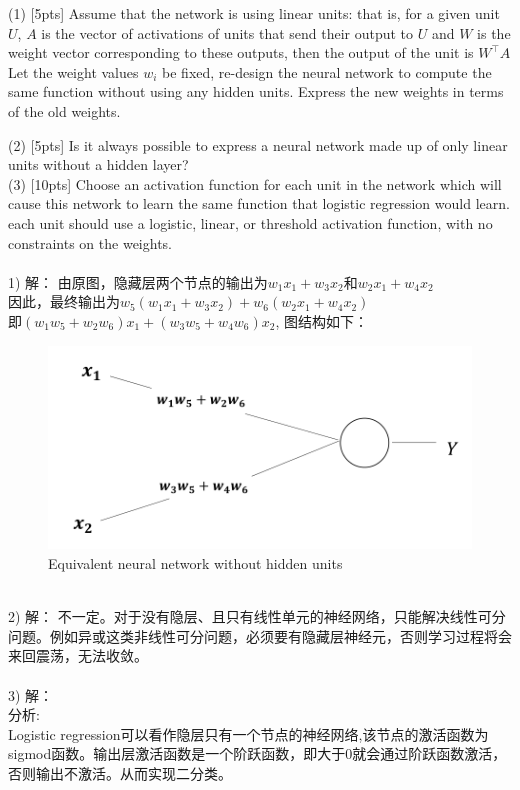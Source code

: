 \documentclass{article}
\begin{document}
	(1) [5pts] Assume that the network is using linear units: that is, for a given unit $U$, $A$ is the vector of activations of units that send their output to $U$ and $W$ is the weight vector corresponding to these outputs, then the output of the unit is $W^{\top}A$ Let the weight values $w_i$ be fixed, re-design the neural network to compute the same function without using any hidden units. Express the new weights in terms of the old weights.

	(2) [5pts] Is it always possible to express a neural network made up of only linear units without a hidden layer?\\
	
	(3) [10pts] Choose an activation function for each unit in the network which will cause this network to learn the same function that logistic regression would learn. each unit should use a logistic, linear, or threshold activation function, with no constraints on the weights.\\\\
	1) 解：
		由原图，隐藏层两个节点的输出为$w_1x_1+w_3x_2$和$w_2x_1+w_4x_2$\\
		因此，最终输出为$w_5(w_1x_1+w_3x_2)+w_6(w_2x_1+w_4x_2)$\\
		即$(w_1w_5+w_2w_6)x_1+(w_3w_5+w_4w_6)x_2$, 图结构如下：\\
		\begin{figure}[htbp]
			\centering
			\includegraphics[scale=0.5]{NeuralNetwork_2_1.png}
			\caption{Equivalent neural network without hidden units}
		\end{figure}
	\\
	2) 解：
		不一定。对于没有隐层、且只有线性单元的神经网络，只能解决线性可分问题。例如异或这类非线性可分问题，必须要有隐藏层神经元，否则学习过程将会来回震荡，无法收敛。\\
	\\3) 解：\\
	分析:\\Logistic regression可以看作隐层只有一个节点的神经网络,该节点的激活函数为sigmod函数。输出层激活函数是一个阶跃函数，即大于0就会通过阶跃函数激活，否则输出不激活。从而实现二分类。\\\\
\end{document}
